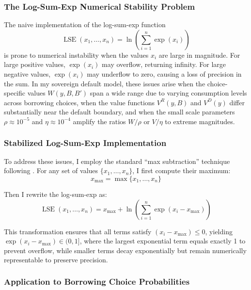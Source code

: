 \documentclass[12pt]{article}
\theoremstyle{plain}
\begin{document}
\subsubsection{The Log-Sum-Exp Numerical Stability Problem}

The naive implementation of the log-sum-exp function
\begin{equation}\label{eq:lse_naive}
	\operatorname{LSE}(x_1, \ldots, x_n) = \ln\left(\sum_{i=1}^n \exp(x_i)\right)
\end{equation}
is prone to numerical instability when the values $x_i$ are large in magnitude. For large positive values, $\exp(x_i)$ may overflow, returning infinity. For large negative values, $\exp(x_i)$ may underflow to zero, causing a loss of precision in the sum. In my sovereign default model, these issues arise when the choice-specific values $W(y,B,B')$ span a wide range due to varying consumption levels across borrowing choices, when the value functions $V^R(y,B)$ and $V^D(y)$ differ substantially near the default boundary, and when the small scale parameters $\rho \approx 10^{-5}$ and $\eta \approx 10^{-4}$ amplify the ratios $W/\rho$ or $V/\eta$ to extreme magnitudes.

\subsubsection{Stabilized Log-Sum-Exp Implementation}

To address these issues, I employ the standard ``max subtraction'' technique
following \citet{MIHALACHEOREEF2024}. For any set of values $\{x_1, \ldots,
	x_n\}$, I first compute their maximum:
\begin{equation}\label{eq:x_max}
	x_{\max} = \max\{x_1, \ldots, x_n\}
\end{equation}

Then I rewrite the log-sum-exp as:
\begin{equation}\label{eq:lse_stable}
	\operatorname{LSE}(x_1, \ldots, x_n) = x_{\max} + \ln\left(\sum_{i=1}^n \exp(x_i - x_{\max})\right)
\end{equation}

This transformation ensures that all terms satisfy $(x_i - x_{\max}) \leq 0$,
yielding $\exp(x_i - x_{\max}) \in (0,1]$, where the largest exponential term
equals exactly 1 to prevent overflow, while smaller terms decay exponentially
but remain numerically representable to preserve precision.

\subsubsection{Application to Borrowing Choice Probabilities}
\end{document}
